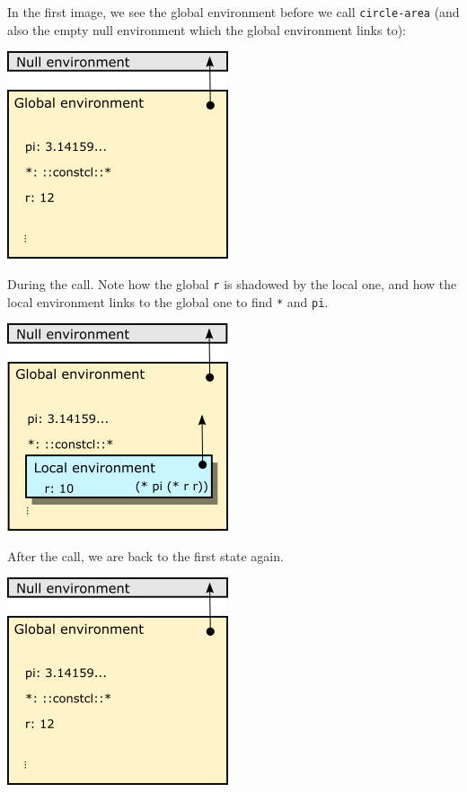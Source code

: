 \documentclass[twoside,9pt]{report}
\begin{document}
In the first image, we see the global environment before we call \texttt{circle-area} (and also the empty null environment which the global environment links to):


\includegraphics{images/env1.png}


During the call. Note how the global \texttt{r} is shadowed by the local one, and how the local environment links to the global one to find \texttt{*} and \texttt{pi}.


\includegraphics{images/env2.png}


After the call, we are back to the first state again.


\includegraphics{images/env1.png}
\end{document}
